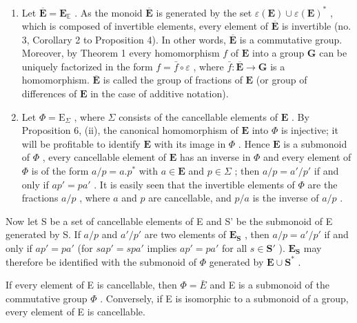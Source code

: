 \begin{enumerate}
\def\labelenumi{(\alph{enumi})}
\item
  Let \(\overline{\mathbf{E}} = \mathbf{E}_{\mathbb{E}}\) . As the monoid \(\overline{\mathbf{E}}\) is generated by the set \(\varepsilon(\mathbf{E}) \cup \varepsilon(\mathbf{E})^*\) , which is composed of invertible elements, every element of \(\overline{\mathbf{E}}\) is invertible (no. 3, Corollary 2 to Proposition 4). In other words, \(\overline{\mathbf{E}}\) is a commutative group. Moreover, by Theorem 1 every homomorphism \(f\) of \(\mathbf{E}\) into a group \(\mathbf{G}\) can be uniquely factorized in the form \(f = \bar{f} \circ \varepsilon\) , where \(\bar{f}: \overline{\mathbf{E}} \to \mathbf{G}\) is a homomorphism. \(\overline{\mathbf{E}}\) is called the group of fractions of \(\mathbf{E}\) (or group of differences of \(\mathbf{E}\) in the case of additive notation).
\item
  Let \(\Phi = \mathrm{E}_{\Sigma}\) , where \(\Sigma\) consists of the cancellable elements of \(\mathbf{E}\) . By Proposition 6, (ii), the canonical homomorphism of \(\mathbf{E}\) into \(\Phi\) is injective; it will be profitable to identify \(\mathbf{E}\) with its image in \(\Phi\) . Hence \(\mathbf{E}\) is a submonoid of \(\Phi\) , every cancellable element of \(\mathbf{E}\) has an inverse in \(\Phi\) and every element of \(\Phi\) is of the form \(a/p = a.p^{*}\) with \(a \in \mathbf{E}\) and \(p \in \Sigma\) ; then \(a/p = a'/p'\) if and only if \(ap' = pa'\) . It is easily seen that the invertible elements of \(\Phi\) are the fractions \(a/p\) , where \(a\) and \(p\) are cancellable, and \(p/a\) is the inverse of \(a/p\) .
\end{enumerate}

Now let S be a set of cancellable elements of E and S' be the submonoid of E generated by S. If \(a/p\) and \(a'/p'\) are two elements of \(\mathbf{E}_{\mathbf{S}}\) , then \(a/p = a'/p'\) if and only if \(ap' = pa'\) (for \(sap' = spa'\) implies \(ap' = pa'\) for all \(s \in \mathbf{S}'\) ). \(\mathbf{E}_{\mathbf{S}}\) may therefore be identified with the submonoid of \(\Phi\) generated by \(\mathbf{E} \cup \mathbf{S}^*\) .

If every element of E is cancellable, then \(\Phi = \bar{E}\) and E is a submonoid of the commutative group \(\Phi\) . Conversely, if E is isomorphic to a submonoid of a group, every element of E is cancellable.


